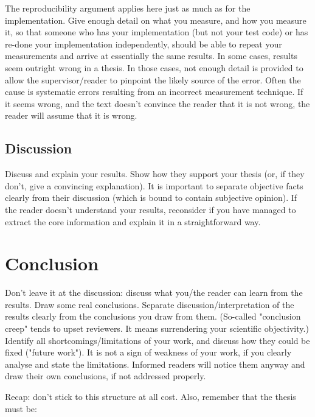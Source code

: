 \documentclass[a4paper,twoside, openright,12pt]{report}
\begin{document}
The reproducibility argument applies here just as much as for the implementation. Give enough detail on what you measure, and how you measure it, so that someone who has your implementation (but not your test code) or has re-done your implementation independently, should be able to repeat your measurements and arrive at essentially the same results. In some cases, results seem outright wrong in a thesis. In those cases, not enough detail is provided to allow the supervisor/reader to pinpoint the likely source of the error. Often the cause is systematic errors resulting from an incorrect measurement technique. If it seems wrong, and the text doesn't convince the reader that it is not wrong, the reader will assume that it is wrong.

\section{Discussion}

Discuss and explain your results. Show how they support your thesis (or, if they don't, give a convincing explanation). It is important to separate objective facts clearly from their discussion (which is bound to contain subjective opinion). If the reader doesn't understand your results, reconsider if you have managed to extract the core information and explain it in a straightforward way.




\chapter{Conclusion}

Don't leave it at the discussion: discuss what you/the reader can learn from the results. Draw some real conclusions. Separate discussion/interpretation of the results clearly from the conclusions you draw from them. (So-called "conclusion creep" tends to upset reviewers. It means surrendering your scientific objectivity.) Identify all shortcomings/limitations of your work, and discuss how they could be fixed ("future work"). It is not a sign of weakness of your work, if you clearly analyse and state the limitations. Informed readers will notice them anyway and draw their own conclusions, if not addressed properly.

\vspace{\baselineskip}
Recap: don't stick to this structure at all cost. Also, remember that the thesis must be:
\end{document}
